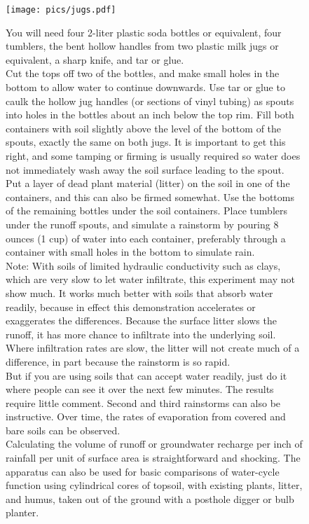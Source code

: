 \documentclass[11pt,letterpaper,twoside,onecolumn]{memoir}
\begin{document}
\begin{figure}
\centering
\texttt{[image: pics/jugs.pdf]}
\caption*{You will need four 2-liter plastic soda bottles or equivalent, four tumblers, the bent hollow handles from two plastic milk jugs or equivalent, a sharp knife, and tar or glue.\\

Cut the tops off two of the bottles, and make small holes in the bottom to allow water to continue downwards. Use tar or glue to caulk the hollow jug handles (or sections of vinyl tubing) as spouts into holes in the bottles about an inch below the top rim. Fill both containers with soil slightly above the level of the bottom of the spouts, exactly the same on both jugs. It is important to get this right, and some tamping or firming is usually required so water does not immediately wash away the soil surface leading to the spout. Put a layer of dead plant material (litter) on the soil in one of the containers, and this can also be firmed somewhat. Use the bottoms of the remaining bottles under the soil containers. Place tumblers under the runoff spouts, and simulate a rainstorm by pouring 8 ounces (1 cup) of water into each container, preferably through a container with small holes in the bottom to simulate rain.\\

Note: With soils of limited hydraulic conductivity such as clays, which are very slow to let water infiltrate, this experiment may not show much. It works much better with soils that absorb water readily, because in effect this demonstration accelerates or exaggerates the differences. Because the surface litter slows the runoff, it has more chance to infiltrate into the underlying soil. Where infiltration rates are slow, the litter will not create much of a difference, in part because the rainstorm is so rapid.\\

But if you are using soils that can accept water readily, just do it where people can see it over the next few minutes. The results require little comment. Second and third rainstorms can also be instructive. Over time, the rates of evaporation from covered and bare soils can be observed.\\

Calculating the volume of runoff or groundwater recharge per inch of rainfall per unit of surface area is straightforward and shocking. The apparatus can also be used for basic comparisons of water-cycle function using cylindrical cores of topsoil, with existing plants, litter, and humus, taken out of the ground with a posthole digger or bulb planter.}

\end{figure}
\end{document}
